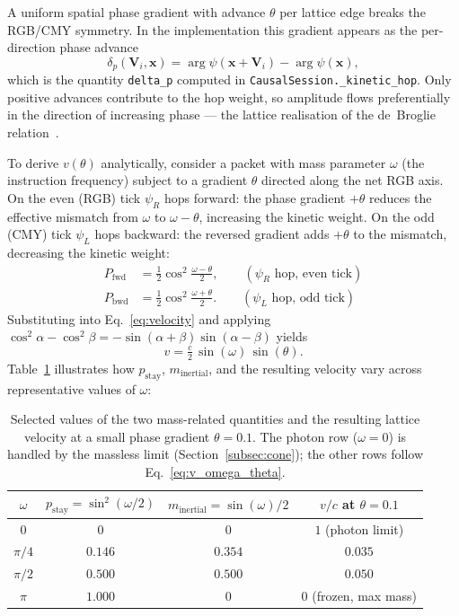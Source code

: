 A uniform spatial phase gradient with advance $\theta$ per lattice edge
breaks the RGB/CMY symmetry.  In the implementation this gradient
appears as the per-direction phase advance
\begin{equation}
    \delta_p(\mathbf{V}_i, \mathbf{x})
        = \arg\psi(\mathbf{x} + \mathbf{V}_i) - \arg\psi(\mathbf{x}),
    \label{eq:delta_p}
\end{equation}
which is the quantity \texttt{delta\_p} computed in
\texttt{CausalSession.\_kinetic\_hop}.  Only positive advances
contribute to the hop weight, so amplitude flows preferentially in the
direction of increasing phase — the lattice realisation of the
de~Broglie relation~\cite{debroglie1924}.

To derive $v(\theta)$ analytically, consider a packet with mass
parameter $\omega$ (the instruction frequency) subject to a gradient
$\theta$ directed along the net RGB axis.  On the even (RGB) tick
$\psi_R$ hops forward: the phase gradient $+\theta$ reduces the
effective mismatch from $\omega$ to $\omega - \theta$, increasing the
kinetic weight.  On the odd (CMY) tick $\psi_L$ hops backward: the
reversed gradient adds $+\theta$ to the mismatch, decreasing the
kinetic weight:
\begin{align}
    P_\mathrm{fwd} &= \tfrac{1}{2}\cos^2\!\tfrac{\omega - \theta}{2},
    \qquad (\psi_R\text{ hop, even tick})
    \label{eq:Pfwd} \\
    P_\mathrm{bwd} &= \tfrac{1}{2}\cos^2\!\tfrac{\omega + \theta}{2}.
    \qquad (\psi_L\text{ hop, odd tick})
    \label{eq:Pbwd}
\end{align}
Substituting into Eq.~\eqref{eq:velocity} and applying
$\cos^2\alpha - \cos^2\beta = -\sin(\alpha+\beta)\sin(\alpha-\beta)$
yields
\begin{equation}
    v = \tfrac{c}{2}\,\sin(\omega)\,\sin(\theta).
    \label{eq:v_omega_theta}
\end{equation}
Table~\ref{tab:mass_velocity} illustrates how $p_\mathrm{stay}$,
$m_\mathrm{inertial}$, and the resulting velocity vary across
representative values of $\omega$:
\begin{table}[h]
\centering
\begin{tabular}{cccc}
\hline
$\omega$ & $p_\mathrm{stay} = \sin^2(\omega/2)$ &
           $m_\mathrm{inertial} = \sin(\omega)/2$ &
           $v/c$ at $\theta = 0.1$ \\
\hline
$0$       & $0$     & $0$     & $1$ \quad (photon limit) \\
$\pi/4$   & $0.146$ & $0.354$ & $0.035$ \\
$\pi/2$   & $0.500$ & $0.500$ & $0.050$ \\
$\pi$     & $1.000$ & $0$     & $0$ \quad (frozen, max mass) \\
\hline
\end{tabular}
\caption{Selected values of the two mass-related quantities and the
  resulting lattice velocity at a small phase gradient $\theta = 0.1$.
  The photon row ($\omega = 0$) is handled by the massless limit
  (Section~\ref{subsec:cone}); the other rows follow
  Eq.~\eqref{eq:v_omega_theta}.}
\label{tab:mass_velocity}
\end{table}

